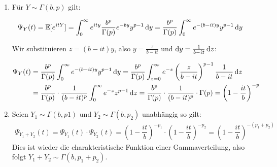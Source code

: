 \begin{loesung}
    \begin{enumerate}
        \item 
        Für $Y \sim \Gamma(b,p)$ gilt:

        \begin{align*}
            \Psi_Y(t) 
            &= \mathbb E[e^{itY}] 
            = \int_{0}^{\infty} e^{ity} \frac{b^p}{\Gamma(p)} e^{-by} y^{p-1} \mathop{}\!\mathrm{d} y 
            = \frac{b^p}{\Gamma(p)} \int_{0}^{\infty} e^{-(b-it)y} y^{p-1} \mathop{}\!\mathrm{d} y
        \end{align*}

        Wir substituieren $z = (b-it)y$, also $y = \frac{z}{b-it}$ und $\mathop{}\!\mathrm{d} y = \frac{1}{b-it}\mathop{}\!\mathrm{d} z$:

        \begin{align*}
            \Psi_Y(t) &=
            \frac{b^p}{\Gamma(p)}\int_{0}^{\infty} e^{-(b-it)y} y^{p-1} \mathop{}\!\mathrm{d} y
            = \frac{b^p}{\Gamma(p)}\int_{z=0}^{\infty} e^{-z} \left(\frac{z}{b-it}\right)^{p-1} \frac{1}{b-it} \mathop{}\!\mathrm{d} z \\
            &= \frac{b^p}{\Gamma(p)}\cdot\frac{1}{(b-it)^p} \int_{0}^{\infty} e^{-z} z^{p-1} \mathop{}\!\mathrm{d} z 
            = \frac{b^p}{\Gamma(p)}\cdot\frac{1}{(b-it)^p}\cdot \Gamma(p)
            = \left(1-\dfrac{it}{b}\right)^{-p}
        \end{align*}
        \item Seien $Y_1\sim \Gamma(b,p1)$ und $Y_2\sim \Gamma(b,p_2)$ unabhängig so gilt:
        \begin{align*}
            \Psi_{Y_1+Y_2}(t) 
            = \Psi_{Y_1}(t)\cdot\Psi_{Y_2}(t) 
            = \left(1-\dfrac{it}{b}\right)^{-p_1}\cdot\left(1-\dfrac{it}{b}\right)^{-p_2}
            = \left(1-\dfrac{it}{b}\right)^{-(p_1+p_2)}
        \end{align*}
        Dies ist wieder die charakteristische Funktion einer Gammaverteilung, also folgt $Y_1+Y_2\sim\Gamma(b,p_1+p_2)$.
    \end{enumerate}
\end{loesung}

